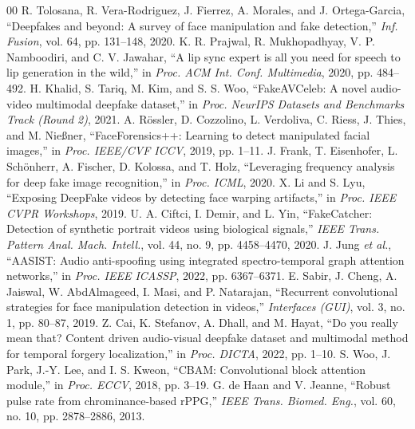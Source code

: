 \documentclass[conference]{IEEEtran}
\begin{document}
\begin{thebibliography}{00}
\setlength{\itemsep}{0pt}
\setlength{\parsep}{0pt}
 R. Tolosana, R. Vera-Rodriguez, J. Fierrez, A. Morales, and J. Ortega-Garcia, ``Deepfakes and beyond: A survey of face manipulation and fake detection,'' \emph{Inf. Fusion}, vol. 64, pp. 131--148, 2020.
 K. R. Prajwal, R. Mukhopadhyay, V. P. Namboodiri, and C. V. Jawahar, ``A lip sync expert is all you need for speech to lip generation in the wild,'' in \emph{Proc. ACM Int. Conf. Multimedia}, 2020, pp. 484--492.
 H. Khalid, S. Tariq, M. Kim, and S. S. Woo, ``FakeAVCeleb: A novel audio-video multimodal deepfake dataset,'' in \emph{Proc. NeurIPS Datasets and Benchmarks Track (Round 2)}, 2021.
 A. R\"{o}ssler, D. Cozzolino, L. Verdoliva, C. Riess, J. Thies, and M. Nie{\ss}ner, ``FaceForensics++: Learning to detect manipulated facial images,'' in \emph{Proc. IEEE/CVF ICCV}, 2019, pp. 1--11.
 J. Frank, T. Eisenhofer, L. Sch\"{o}nherr, A. Fischer, D. Kolossa, and T. Holz, ``Leveraging frequency analysis for deep fake image recognition,'' in \emph{Proc. ICML}, 2020.
 X. Li and S. Lyu, ``Exposing DeepFake videos by detecting face warping artifacts,'' in \emph{Proc. IEEE CVPR Workshops}, 2019.
 U. A. Ciftci, I. Demir, and L. Yin, ``FakeCatcher: Detection of synthetic portrait videos using biological signals,'' \emph{IEEE Trans. Pattern Anal. Mach. Intell.}, vol. 44, no. 9, pp. 4458--4470, 2020.
 J. Jung \emph{et al.}, ``AASIST: Audio anti-spoofing using integrated spectro-temporal graph attention networks,'' in \emph{Proc. IEEE ICASSP}, 2022, pp. 6367--6371.
 E. Sabir, J. Cheng, A. Jaiswal, W. AbdAlmageed, I. Masi, and P. Natarajan, ``Recurrent convolutional strategies for face manipulation detection in videos,'' \emph{Interfaces (GUI)}, vol. 3, no. 1, pp. 80--87, 2019.
 Z. Cai, K. Stefanov, A. Dhall, and M. Hayat, ``Do you really mean that? Content driven audio-visual deepfake dataset and multimodal method for temporal forgery localization,'' in \emph{Proc. DICTA}, 2022, pp. 1--10.
 S. Woo, J. Park, J.-Y. Lee, and I. S. Kweon, ``CBAM: Convolutional block attention module,'' in \emph{Proc. ECCV}, 2018, pp. 3--19.
 G. de Haan and V. Jeanne, ``Robust pulse rate from chrominance-based rPPG,'' \emph{IEEE Trans. Biomed. Eng.}, vol. 60, no. 10, pp. 2878--2886, 2013.
\end{thebibliography}
\end{document}

